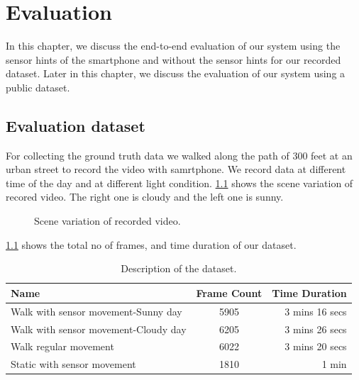 \chapter{Evaluation}
\label{c:evalu}

In this chapter, we discuss the end-to-end evaluation of our system using the sensor hints of the smartphone and without the sensor hints for our recorded dataset.
Later in this chapter, we discuss the evaluation of our system using a public dataset.

\section{Evaluation dataset}
\label{s:eval}
For collecting the ground truth data we walked along the path of 300 feet at an urban street to record the video with samrtphone.
We record data at different time of the day and at different light condition.
\ref{f:dataset} shows the scene variation of recored video.
The right one is cloudy and the left one is sunny.

\begin{figure}[!ht]
\centering
{}
\hfill
{}
\caption{Scene variation of recorded video.}
\label{f:dataset}
\end{figure}

\ref{t:dataset} shows the total no of frames, and time duration of our dataset.

\begin{table}[h!]
  \centering
  \caption{Description of the dataset.}
  \label{t:dataset}
  \begin{tabular}{  l  c  r  }   
    Name & Frame Count & Time Duration \\
    \hline
    Walk with sensor movement-Sunny day & 5905 & 3 mins 16 secs  \\
    Walk with sensor movement-Cloudy day & 6205 & 3 mins 26 secs \\
    Walk regular movement & 6022 & 3 mins 20 secs \\
    Static with sensor movement & 1810 & 1 min \\
    \hline
  \end{tabular}
\end{table}

